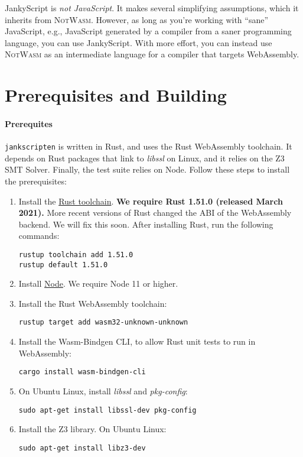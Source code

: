 \documentclass{article}
\newcommand{\system}{\texttt{jankscripten}\xspace}
\newcommand{\notwasm}{\textsc{NotWasm}\xspace}
\newcommand{\jankyscript}{JankyScript\xspace}
\begin{document}
\jankyscript is \emph{not JavaScript}. It makes several simplifying
assumptions, which it inherits from \notwasm. However, as long as you're
working with ``sane'' JavaScript, e.g., JavaScript generated by a compiler from
a saner programming language, you can use JankyScript. With more effort, you
can instead use \notwasm as an intermediate language for a compiler that
targets WebAssembly.

\section{Prerequisites and Building}

\paragraph{Prerequites}
\system is written in Rust, and uses the Rust WebAssembly toolchain. It depends
on Rust packages that link to \emph{libssl} on Linux, and it relies on the Z3
SMT Solver. Finally, the test suite relies on Node. Follow these steps to
install the prerequisites:

\begin{enumerate}

\item Install the \href{https://rustup.rs/}{Rust toolchain}.
\textbf{We require Rust 1.51.0 (released March 2021).} More recent versions of
Rust changed the ABI of the WebAssembly backend. We will fix this soon.
After installing Rust, run the following commands:

\begin{verbatim}
rustup toolchain add 1.51.0
rustup default 1.51.0
\end{verbatim}

\item Install \href{https://nodejs.org/en/}{Node}. We require Node 11 or higher.

\item Install the Rust WebAssembly toolchain:

\begin{verbatim}
rustup target add wasm32-unknown-unknown
\end{verbatim}

\item Install the Wasm-Bindgen CLI, to allow Rust unit tests to run in WebAssembly:

\begin{verbatim}
cargo install wasm-bindgen-cli
\end{verbatim}

\item On Ubuntu Linux, install \emph{libssl} and \emph{pkg-config}:

\begin{verbatim}
sudo apt-get install libssl-dev pkg-config
\end{verbatim}

\item Install the Z3 library. On Ubuntu Linux:

\begin{verbatim}
sudo apt-get install libz3-dev
\end{verbatim}

\end{enumerate}
\end{document}
